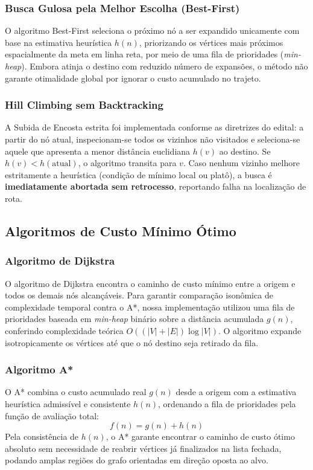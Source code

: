 \documentclass[a4paper,10pt,twocolumn]{article}
\begin{document}
\subsubsection{Busca Gulosa pela Melhor Escolha (Best-First)}
O algoritmo Best-First seleciona o próximo nó a ser expandido unicamente com base na estimativa heurística $h(n)$, priorizando os vértices mais próximos espacialmente da meta em linha reta, por meio de uma fila de prioridades (\textit{min-heap}). Embora atinja o destino com reduzido número de expansões, o método não garante otimalidade global por ignorar o custo acumulado no trajeto.

\subsubsection{Hill Climbing sem Backtracking}
A Subida de Encosta estrita foi implementada conforme as diretrizes do edital: a partir do nó atual, inspecionam-se todos os vizinhos não visitados e seleciona-se aquele que apresenta a menor distância euclidiana $h(v)$ ao destino. Se $h(v) < h(\text{atual})$, o algoritmo transita para $v$. Caso nenhum vizinho melhore estritamente a heurística (condição de mínimo local ou platô), a busca é \textbf{imediatamente abortada sem retrocesso}, reportando falha na localização de rota.

\subsection{Algoritmos de Custo Mínimo Ótimo}

\subsubsection{Algoritmo de Dijkstra}
O algoritmo de Dijkstra \cite{dijkstra1959} encontra o caminho de custo mínimo entre a origem e todos os demais nós alcançáveis. Para garantir comparação isonômica de complexidade temporal contra o A*, nossa implementação utilizou uma fila de prioridades baseada em \textit{min-heap} binário sobre a distância acumulada $g(n)$, conferindo complexidade teórica $O((|V| + |E|) \log |V|)$. O algoritmo expande isotropicamente os vértices até que o nó destino seja retirado da fila.

\subsubsection{Algoritmo A*}
O A* \cite{hart1968} combina o custo acumulado real $g(n)$ desde a origem com a estimativa heurística admissível e consistente $h(n)$, ordenando a fila de prioridades pela função de avaliação total:
\begin{equation}
    f(n) = g(n) + h(n)
\end{equation}
Pela consistência de $h(n)$, o A* garante encontrar o caminho de custo ótimo absoluto sem necessidade de reabrir vértices já finalizados na lista fechada, podando amplas regiões do grafo orientadas em direção oposta ao alvo.
\end{document}

